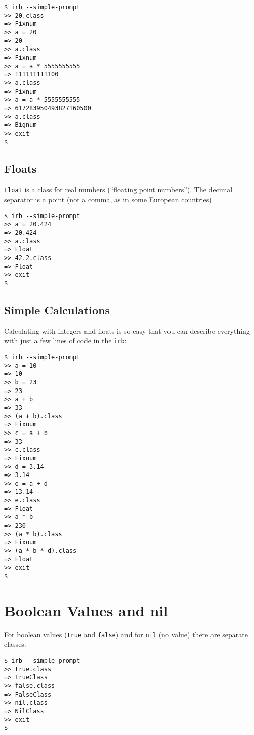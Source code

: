 \documentclass[a4paper]{book}
\newcommand{\chap}[1]{\newpage\thispagestyle{empty}\chapter{#1}\label{chap:\thechapter}}
\begin{document}
\begin{shaded}\begin{verbatim}
$ irb --simple-prompt
>> 20.class
=> Fixnum
>> a = 20
=> 20
>> a.class
=> Fixnum
>> a = a * 5555555555
=> 111111111100
>> a.class
=> Fixnum
>> a = a * 5555555555
=> 617283950493827160500
>> a.class
=> Bignum
>> exit
$
\end{verbatim}\end{shaded}

\section{Floats}\label{floats}

\texttt{Float} is a class for real numbers (“floating point numbers”). The decimal separator is a point (not a comma, as in some European countries).

\begin{shaded}\begin{verbatim}
$ irb --simple-prompt
>> a = 20.424
=> 20.424
>> a.class
=> Float
>> 42.2.class
=> Float
>> exit
$
\end{verbatim}\end{shaded}

\section{Simple Calculations}\label{simple-calculations}

Calculating with integers and floats is so easy that you can describe everything with just a few lines of code in the \texttt{irb}:

\begin{shaded}\begin{verbatim}
$ irb --simple-prompt
>> a = 10
=> 10
>> b = 23
=> 23
>> a + b
=> 33
>> (a + b).class
=> Fixnum
>> c = a + b
=> 33
>> c.class
=> Fixnum
>> d = 3.14
=> 3.14
>> e = a + d
=> 13.14
>> e.class
=> Float
>> a * b
=> 230
>> (a * b).class
=> Fixnum
>> (a * b * d).class
=> Float
>> exit
$
\end{verbatim}\end{shaded}

\chap{Boolean Values and nil}\label{boolean-values-and-nil}

For boolean values (\texttt{true} and \texttt{false}) and for \texttt{nil} (no value) there are separate classes:

\begin{shaded}\begin{verbatim}
$ irb --simple-prompt
>> true.class
=> TrueClass
>> false.class
=> FalseClass
>> nil.class
=> NilClass
>> exit
$
\end{verbatim}\end{shaded}
\end{document}
